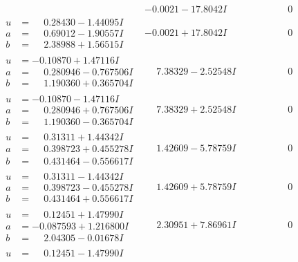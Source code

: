 \documentclass[1p]{elsarticle_modified}
\theoremstyle{definition}
\begin{document}
$$\begin{array}{c|c|c}
 & -0.0021 - 17.8042 I & \phantom{-0.000000 } 0 \\ \hline\begin{aligned}
u &= \phantom{-}0.28430 - 1.44095 I \\
a &= \phantom{-}0.69012 - 1.90557 I \\
b &= \phantom{-}2.38988 + 1.56515 I\end{aligned}
 & -0.0021 + 17.8042 I & \phantom{-0.000000 } 0 \\ \hline\begin{aligned}
u &= -0.10870 + 1.47116 I \\
a &= \phantom{-}0.280946 - 0.767506 I \\
b &= \phantom{-}1.190360 + 0.365704 I\end{aligned}
 & \phantom{-}7.38329 - 2.52548 I & \phantom{-0.000000 } 0 \\ \hline\begin{aligned}
u &= -0.10870 - 1.47116 I \\
a &= \phantom{-}0.280946 + 0.767506 I \\
b &= \phantom{-}1.190360 - 0.365704 I\end{aligned}
 & \phantom{-}7.38329 + 2.52548 I & \phantom{-0.000000 } 0 \\ \hline\begin{aligned}
u &= \phantom{-}0.31311 + 1.44342 I \\
a &= \phantom{-}0.398723 + 0.455278 I \\
b &= \phantom{-}0.431464 - 0.556617 I\end{aligned}
 & \phantom{-}1.42609 - 5.78759 I & \phantom{-0.000000 } 0 \\ \hline\begin{aligned}
u &= \phantom{-}0.31311 - 1.44342 I \\
a &= \phantom{-}0.398723 - 0.455278 I \\
b &= \phantom{-}0.431464 + 0.556617 I\end{aligned}
 & \phantom{-}1.42609 + 5.78759 I & \phantom{-0.000000 } 0 \\ \hline\begin{aligned}
u &= \phantom{-}0.12451 + 1.47990 I \\
a &= -0.087593 + 1.216800 I \\
b &= \phantom{-}2.04305 - 0.01678 I\end{aligned}
 & \phantom{-}2.30951 + 7.86961 I & \phantom{-0.000000 } 0 \\ \hline\begin{aligned}
u &= \phantom{-}0.12451 - 1.47990 I \\

\end{aligned}
\end{array}$$
\end{document}
